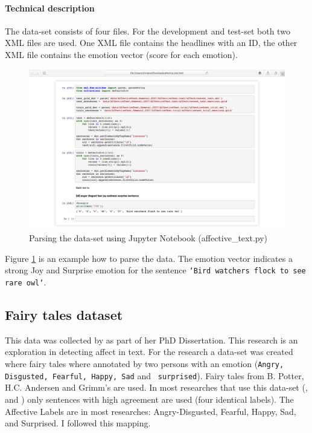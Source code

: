 \documentclass[11pt]{article}
\begin{document}
\paragraph{Technical description}
The data-set consists of four files. For the development and test-set both two XML files are used. One XML file contains the headlines with an ID, the other XML file contains the emotion vector (score for each emotion).
\begin{figure}[htb]
  \includegraphics[width=\linewidth]{dataset_affective.png}
  \caption{Parsing the data-set using Jupyter Notebook (affective\_text.py)}
  \label{fig:dataset_affective}
\end{figure}
Figure \ref{fig:dataset_affective} is an example how to parse the data. The emotion vector indicates a strong Joy and Surprise emotion for the sentence \texttt{`Bird watchers flock to see rare owl`}.


\subsection{Fairy tales dataset}
This data was collected by  as part of her PhD Dissertation\cite{alm2008affect}. This research is an exploration in detecting affect in text. For the research a data-set was created where fairy tales where annotated by two persons with an emotion (\texttt{Angry, Disgusted, Fearful, Happy, Sad} and \texttt{ surprised}). Fairy tales  from B. Potter, H.C. Andersen and Grimm's are used. In most researches that use this data-set (\cite{kim2010evaluation}, \cite{calvo2013emotions} and \cite{chaffar2011using}) only sentences with high agreement are used (four identical labels). The Affective Labels are in most researches: Angry-Disgusted, Fearful, Happy, Sad, and Surprised. I followed this mapping.
\end{document}
